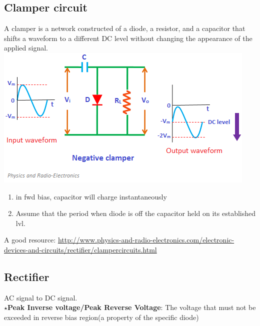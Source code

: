 \documentclass[10pt, a4paper]{report}
\begin{document}
	\subsection{Clamper circuit}
	A clamper is a network constructed of a diode, a resistor, and a capacitor that shifts a waveform to a different DC level without changing the appearance of the applied signal.
	\includegraphics[width=\linewidth]{img/negativeclamper}
	\begin{enumerate}
		\item in fwd bias, capacitor will charge instantaneously
		\item Assume that the period when diode is off the capacitor held on its established lvl.
	\end{enumerate}
	A good resource: \href{http://www.physics-and-radio-electronics.com/electronic-devices-and-circuits/rectifier/clampercircuits.html}{http://www.physics-and-radio-electronics.com/electronic-devices-and-circuits/rectifier/clampercircuits.html}
	
	\subsection{Rectifier}
	AC signal to DC signal.\\
	$\star$\textbf{Peak Inverse voltage/Peak Reverse Voltage}: The voltage that must not be exceeded in reverse bias region(a property of the specific diode)
\end{document}
